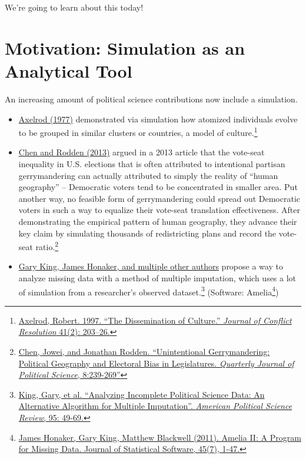 \documentclass[]{book}
\providecommand{\tightlist}{%
  \setlength{\itemsep}{0pt}\setlength{\parskip}{0pt}}
\let\rmarkdownfootnote\footnote%
\def\footnote{\protect\rmarkdownfootnote}
\theoremstyle{definition}
\theoremstyle{definition}
\theoremstyle{definition}
\theoremstyle{remark}
\begin{document}
We're going to learn about this today!

\section{Motivation: Simulation as an Analytical
Tool}\label{motivation-simulation-as-an-analytical-tool}

An increasing amount of political science contributions now include a
simulation.

\begin{itemize}
\tightlist
\item
  \href{http://www-personal.umich.edu/~axe/research/Dissemination.pdf}{Axelrod
  (1977)} demonstrated via simulation how atomized individuals evolve to
  be grouped in similar clusters or countries, a model of
  culture.\footnote{\href{http://www-personal.umich.edu/~axe/research/Dissemination.pdf}{Axelrod,
    Robert. 1997. ``The Dissemination of Culture.'' \emph{Journal of
    Conflict Resolution} 41(2): 203--26.}}
\item
  \href{http://www-personal.umich.edu/~jowei/florida.pdf}{Chen and
  Rodden (2013)} argued in a 2013 article that the vote-seat inequality
  in U.S. elections that is often attributed to intentional partisan
  gerrymandering can actually attributed to simply the reality of
  ``human geography'' -- Democratic voters tend to be concentrated in
  smaller area. Put another way, no feasible form of gerrymandering
  could spread out Democratic voters in such a way to equalize their
  vote-seat translation effectiveness. After demonstrating the empirical
  pattern of human geography, they advance their key claim by simulating
  thousands of redistricting plans and record the vote-seat
  ratio.\footnote{\href{http://www-personal.umich.edu/~jowei/florida.pdf}{Chen,
    Jowei, and Jonathan Rodden. ``Unintentional Gerrymandering:
    Political Geography and Electoral Bias in Legislatures.
    \emph{Quarterly Journal of Political Science}, 8:239-269''}}
\item
  \href{https://gking.harvard.edu/files/abs/evil-abs.shtml}{Gary King,
  James Honaker, and multiple other authors} propose a way to analyze
  missing data with a method of multiple imputation, which uses a lot of
  simulation from a researcher's observed dataset.\footnote{\href{https://gking.harvard.edu/files/abs/evil-abs.shtml}{King,
    Gary, et al. ``Analyzing Incomplete Political Science Data: An
    Alternative Algorithm for Multiple Imputation''. \emph{American
    Political Science Review}, 95: 49-69.}} (Software: Amelia\footnote{\href{http://www.jstatsoft.org/v45/i07/}{James
    Honaker, Gary King, Matthew Blackwell (2011). Amelia II: A Program
    for Missing Data. Journal of Statistical Software, 45(7), 1-47.}})
\end{itemize}
\end{document}
